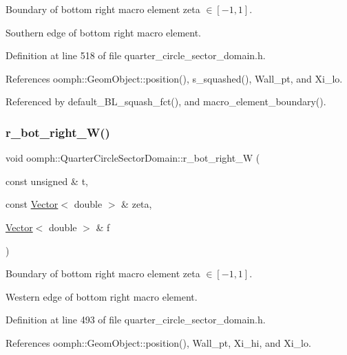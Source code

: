 Boundary of bottom right macro element zeta $ \in [-1,1] $. 

Southern edge of bottom right macro element. 

Definition at line 518 of file quarter\+\_\+circle\+\_\+sector\+\_\+domain.\+h.



References oomph\+::\+Geom\+Object\+::position(), s\+\_\+squashed(), Wall\+\_\+pt, and Xi\+\_\+lo.



Referenced by default\+\_\+\+B\+L\+\_\+squash\+\_\+fct(), and macro\+\_\+element\+\_\+boundary().

\mbox{\label{classoomph_1_1QuarterCircleSectorDomain_a85ba295aaeff2833644691978deac247}} 
\subsubsection{\texorpdfstring{r\+\_\+bot\+\_\+right\+\_\+\+W()}{r\_bot\_right\_W()}}
{\footnotesize\ttfamily void oomph\+::\+Quarter\+Circle\+Sector\+Domain\+::r\+\_\+bot\+\_\+right\+\_\+W (\begin{DoxyParamCaption}\item[{const unsigned \&}]{t,  }\item[{const \hyperlink{classoomph_1_1Vector}{Vector}$<$ double $>$ \&}]{zeta,  }\item[{\hyperlink{classoomph_1_1Vector}{Vector}$<$ double $>$ \&}]{f }\end{DoxyParamCaption})\hspace{0.3cm}{\ttfamily [private]}}



Boundary of bottom right macro element zeta $ \in [-1,1] $. 

Western edge of bottom right macro element. 

Definition at line 493 of file quarter\+\_\+circle\+\_\+sector\+\_\+domain.\+h.



References oomph\+::\+Geom\+Object\+::position(), Wall\+\_\+pt, Xi\+\_\+hi, and Xi\+\_\+lo.



